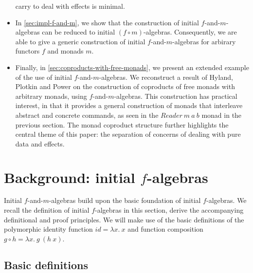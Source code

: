 \documentclass{jfp1}
\begin{document}
\begin{itemize}
  carry to deal with effects is minimal.
\item In \autoref{sec:impl-f-and-m}, we show that the construction of
  initial $f$-and-$m$-algebras can be reduced to initial $(f \circ
  m)$-algebras. Consequently, we are able to give a generic
  construction of initial $f$-and-$m$-algebras for arbirary functors
  $f$ and monads $m$.
\item Finally, in \autoref{sec:coproducts-with-free-monads}, we
  present an extended example of the use of initial
  $f$-and-$m$-algebras. We reconstruct a result of Hyland, Plotkin and
  Power on the construction of coproducts of free monads with
  arbitrary monads, using $f$-and-$m$-algebras. This construction has
  practical interest, in that it provides a general construction of
  monads that interleave abstract and concrete commands, as seen in
  the $\mathit{Reader}~m~a~b$ monad in the previous section. The monad
  coproduct structure further highlights the central theme of this
  paper: the separation of concerns of dealing with pure data and
  effects.
\end{itemize}

\section{Background: initial $f$-algebras}
\label{sec:f-algebras}

Initial $f$-and-$m$-algebras build upon the basic foundation of
initial $f$-algebras. We recall the definition of initial $f$-algebras
in this section, derive the accompanying definitional and proof
principles. We will make use of the basic definitions of the
polymorphic identity function $\mathit{id} = \lambda x.~x$ and
function composition $g \circ h = \lambda x.~g~(h~x)$.

\subsection{Basic definitions}
\end{document}
